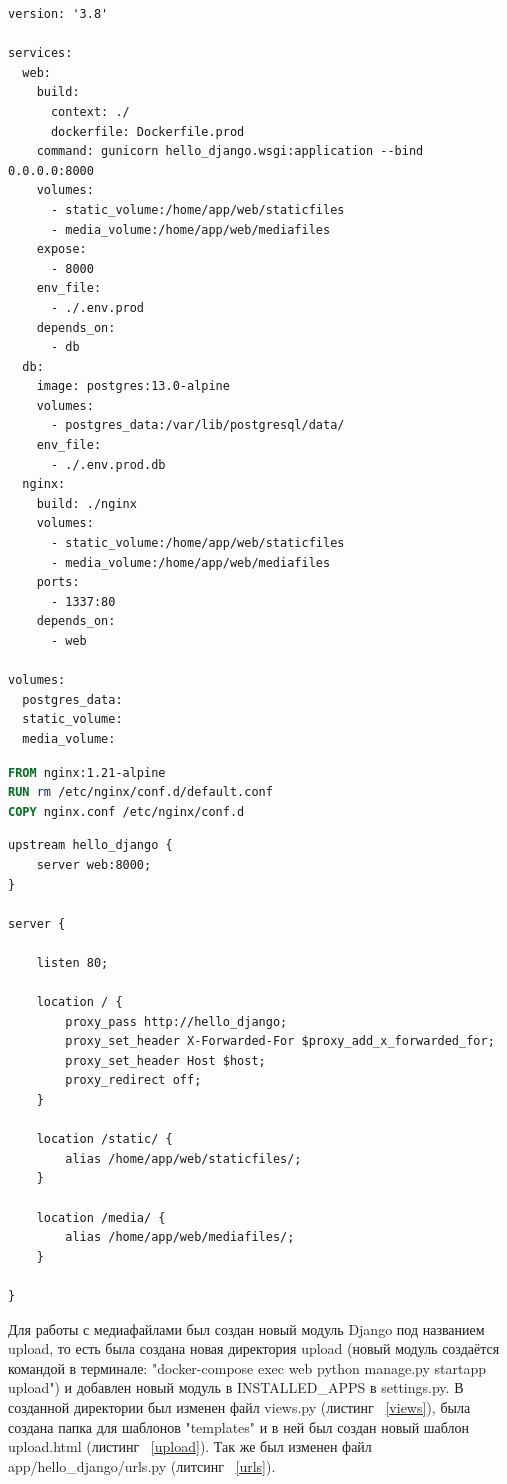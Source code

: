 \begin{lstlisting}[frame=single, label={docker-compose.prod}, caption={\textsf{docker-compose.prod.yml}}, language=docker-compose.prod] 
version: '3.8'

services:
  web:
    build:
      context: ./
      dockerfile: Dockerfile.prod
    command: gunicorn hello_django.wsgi:application --bind 0.0.0.0:8000
    volumes:
      - static_volume:/home/app/web/staticfiles
      - media_volume:/home/app/web/mediafiles
    expose:
      - 8000
    env_file:
      - ./.env.prod
    depends_on:
      - db
  db:
    image: postgres:13.0-alpine
    volumes:
      - postgres_data:/var/lib/postgresql/data/
    env_file:
      - ./.env.prod.db
  nginx:
    build: ./nginx
    volumes:
      - static_volume:/home/app/web/staticfiles
      - media_volume:/home/app/web/mediafiles
    ports:
      - 1337:80
    depends_on:
      - web

volumes:
  postgres_data:
  static_volume:
  media_volume:
\end{lstlisting}

\begin{lstlisting}[frame=single, label={dockerfile_nginx}, caption={\textsf{Dockerfile} в директории \textsf{nginx}}, language=Dockerfile] 
FROM nginx:1.21-alpine
RUN rm /etc/nginx/conf.d/default.conf
COPY nginx.conf /etc/nginx/conf.d
\end{lstlisting}

\begin{lstlisting}[frame=single, label={nginx.conf}, caption={\textsf{nginx.conf}}, language=nginx] 
upstream hello_django {
    server web:8000;
}

server {

    listen 80;

    location / {
        proxy_pass http://hello_django;
        proxy_set_header X-Forwarded-For $proxy_add_x_forwarded_for;
        proxy_set_header Host $host;
        proxy_redirect off;
    }

    location /static/ {
        alias /home/app/web/staticfiles/;
    }

    location /media/ {
        alias /home/app/web/mediafiles/;
    }

}
\end{lstlisting}

	Для работы с медиафайлами был создан новый модуль \textsf{Django} под названием \textsf{upload}, то есть была создана новая директория \textsf{upload} (новый модуль создаётся командой в терминале: "\textsf{docker-compose exec web python manage.py startapp upload}") и добавлен новый модуль в \textsf{INSTALLED_APPS} в \textsf{settings.py}.
	В созданной директории был изменен файл views.py (листинг  ~\ref{views}), была создана папка для шаблонов "templates" и в ней был создан новый шаблон \textsf{upload.html} (листинг ~\ref{upload}). Так же был изменен файл \textsf{app/hello_django/urls.py} (литсинг ~\ref{urls}).

